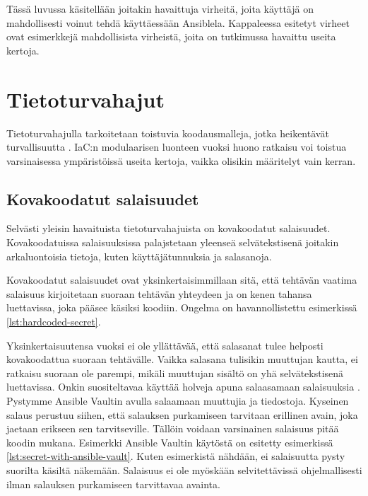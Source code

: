 Tässä luvussa käsitellään joitakin havaittuja virheitä, joita käyttäjä on mahdollisesti
voinut tehdä käyttäessään Ansiblela. Kappaleessa esitetyt virheet ovat esimerkkejä
mahdollisista virheistä, joita on tutkimussa \parencite{RahmanAkond2021SSiA,
RahmanAkond2019TSSS, KumaraIndika2021Tdad} havaittu useita kertoja.

\section{Tietoturvahajut}

Tietoturvahajulla tarkoitetaan toistuvia koodausmalleja, jotka heikentävät turvallisuutta
\parencite{RahmanAkond2021SSiA}. IaC:n modulaarisen luonteen vuoksi huono ratkaisu voi
toistua varsinaisessa ympäristöissä useita kertoja, vaikka olisikin määritelyt vain
kerran.

\subsection{Kovakoodatut salaisuudet}

Selvästi yleisin havaituista tietoturvahajuista on kovakoodatut salaisuudet. Kovakoodatuissa
salaisuuksissa palajstetaan yleenseä selvätekstisenä joitakin arkaluontoisia tietoja, kuten
käyttäjätunnuksia ja salasanoja. \parencite{RahmanAkond2019TSSS}

Kovakoodatut salaisuudet ovat yksinkertaisimmillaan sitä, että tehtävän vaatima salaisuus
kirjoitetaan suoraan tehtävän yhteydeen ja on kenen tahansa luettavissa, joka pääsee käsiksi
koodiin. Ongelma on havannollistettu esimerkissä  \ref{lst:hardcoded-secret}.



Yksinkertaisuutensa vuoksi ei ole yllättävää, että salasanat tulee helposti kovakoodattua
suoraan tehtävälle. Vaikka salasana tulisikin muuttujan kautta, ei ratkaisu suoraan ole
parempi, mikäli muuttujan sisältö on yhä selvätekstisenä luettavissa. Onkin suositeltavaa
käyttää holveja apuna salaasamaan salaisuuksia \parencite{RahmanAkond2019TSSS}. Pystymme
Ansible Vaultin avulla salaamaan muuttujia ja tiedostoja. Kyseinen salaus perustuu siihen,
että salauksen purkamiseen tarvitaan erillinen avain, joka jaetaan erikseen sen tarvitseville.
Tällöin voidaan varsinainen salaisuus pitää koodin mukana. Esimerkki Ansible Vaultin käytöstä
on esitetty esimerkissä \ref{lst:secret-with-ansible-vault}. Kuten esimerkistä nähdään,
ei salaisuutta pysty suorilta käsiltä näkemään. Salaisuus ei ole myöskään selvitettävissä
ohjelmallisesti ilman salauksen purkamiseen tarvittavaa avainta.

